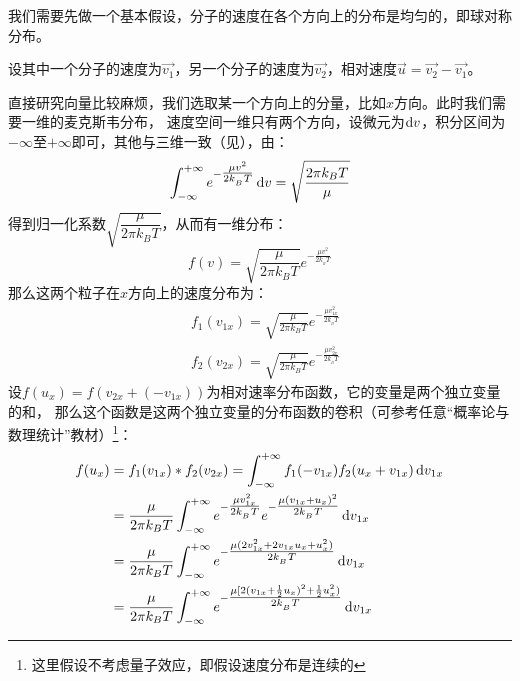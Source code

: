 		\begin{prove}
			我们需要先做一个基本假设，分子的速度在各个方向上的分布是均匀的，即球对称分布。
			
			设其中一个分子的速度为$\vec{v_1}$，另一个分子的速度为$\vec{v_2}$，相对速度$\vec{u} = \vec{v_2} - \vec{v_1}$。
			
			直接研究向量比较麻烦，我们选取某一个方向上的分量，比如$x$方向。此时我们需要一维的麦克斯韦分布，
			速度空间一维只有两个方向，设微元为$\dif v$，积分区间为$-\infty$至$+\infty$即可，其他与三维一致（见），由：
			\begin{equation}
				\int_{-\infty}^{+\infty} e^{-\tfrac{\mu v^{2}}{2k_{_B}T}}\dif{v} = \sqrt{\frac{2\pi k_{B}T}{\mu}}
			\end{equation}
			得到归一化系数$\sqrt{\dfrac{\mu}{2\pi k_{B}T}}$，从而有一维分布：
			\begin{equation*}
				f(v) = \sqrt{\frac{\mu}{2\pi k_{B}T}}e^{-\tfrac{\mu v^{2}}{2k_{_B}T}}
			\end{equation*}
			那么这两个粒子在$x$方向上的速度分布为：
			\begin{equation*}
				\begin{aligned}
					&f_1(v_{1x}) = \sqrt{\frac{\mu}{2\pi k_{B}T}}e^{-\tfrac{\mu v_{1x}^{2}}{2k_{_B}T}}\\
					&f_2(v_{2x}) = \sqrt{\frac{\mu}{2\pi k_{B}T}}e^{-\tfrac{\mu v_{2x}^{2}}{2k_{_B}T}}
				\end{aligned}
			\end{equation*}
			设$f(u_x) = f(v_{2x} + (- v_{1x}))$为相对速率分布函数，它的变量是两个独立变量的和，
			那么这个函数是这两个独立变量的分布函数的卷积（可参考任意“概率论与数理统计”教材）\footnote{这里假设不考虑量子效应，即假设速度分布是连续的}：
			\begin{equation*}
				\begin{aligned}
					f(u_x) &= f_1(v_{1x}) \ast f_2(v_{2x}) = \int_{-\infty}^{+\infty} f_1(- v_{1x})f_2(u_x + v_{1x})\dif v_{1x}\\
					&=\frac{\mu}{2\pi k_{B}T} \int_{-\infty}^{+\infty} e^{-\tfrac{\mu v_{1x}^{2}}{2k_{_B}T}} e^{-\tfrac{\mu (v_{1x} + u_x)^{2}}{2k_{_B}T}} \dif v_{1x}\\
					&=\frac{\mu}{2\pi k_{B}T} \int_{-\infty}^{+\infty} e^{-\tfrac{\mu (2v_{1x}^{2}+ 2v_{1x}u_{x} + u_{x}^{2})}{2k_{_B}T}} \dif v_{1x}\\
					&=\frac{\mu}{2\pi k_{B}T} \int_{-\infty}^{+\infty} e^{-\tfrac{\mu [2(v_{1x} + \frac{1}{2}u_{x})^{2}+ \frac{1}{2} u_{x}^{2})}{2k_{_B}T}} \dif v_{1x}\\

\end{aligned}
\end{equation*}
\end{prove}
